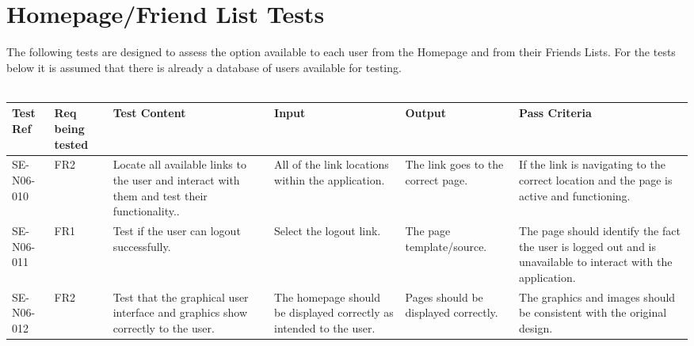 \documentclass[titlepage]{article}
\begin{document}
\section{Homepage/Friend List Tests} 
The following tests are designed to assess the option available to each user from the Homepage and from their Friends Lists. For the tests below it is assumed that there is already a database of users available for testing.\\
\\
\begin{tabular}{|p{1cm}|p{1cm}|p{3cm}|p{3cm}|p{2cm}|p{3cm}|}
\hline
Test Ref & Req being tested & Test Content & Input & Output & Pass Criteria \\ 
\hline
SE-N06-010 & FR2 & Locate all available links to the user and interact with them and test their functionality.. & All of the link locations within the application. &  The link goes to the correct page. & If the link is navigating to the correct  
location and the page is active and functioning. \\
\hline
SE-N06-011 & FR1 & Test if the user can logout successfully. & Select the logout link. & The page template/source. & The page should identify the fact the user is logged 
out and is unavailable to interact with the application. \\
\hline
SE-N06-012 & FR2 & Test that the graphical user interface and graphics show correctly to the user. & The homepage should be displayed correctly as intended to the user. & Pages should be displayed correctly. & The graphics and images should be consistent with the original design.\\ 
\hline 
\end{tabular}
\newpage
\end{document}
